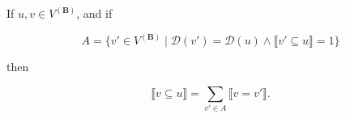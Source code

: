 If $u, v \in V^{(\mathbf{B})}$, and if

$$A = \{v' \in V^{(\mathbf{B})} \mid \mathcal{D}(v') = \mathcal{D}(u) \land \llbracket v' \subseteq u \rrbracket = 1\}$$

then

$$\llbracket v \subseteq u \rrbracket = \sum_{v' \in A} \llbracket v = v' \rrbracket.$$
